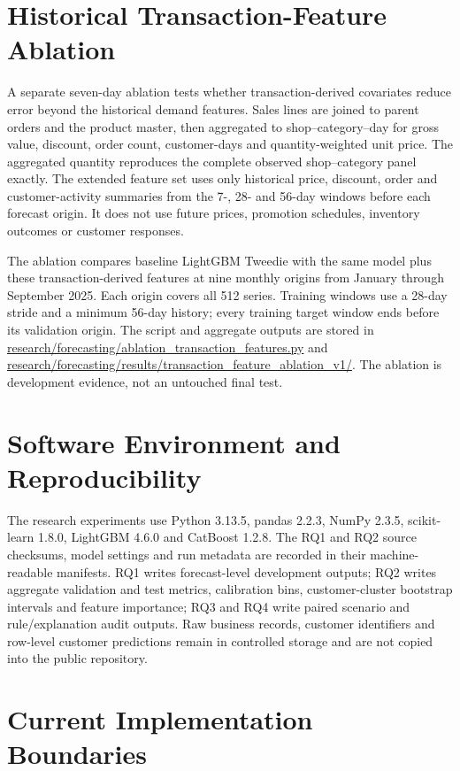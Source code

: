 \documentclass[a4paper,11pt,oneside]{book}
\theoremstyle{plain}
\theoremstyle{definition}
\theoremstyle{remark}
\begin{document}
\section{Historical Transaction-Feature Ablation}

A separate seven-day ablation tests whether transaction-derived covariates
reduce error beyond the historical demand features. Sales lines are joined
to parent orders and the product master, then aggregated to shop--category--day
for gross value, discount, order count, customer-days and quantity-weighted
unit price. The aggregated quantity reproduces the complete observed
shop--category panel exactly. The extended feature set uses only historical
price, discount, order and customer-activity summaries from the 7-, 28- and
56-day windows before each forecast origin. It does not use future prices,
promotion schedules, inventory outcomes or customer responses.

The ablation compares baseline LightGBM Tweedie with the same model plus
these transaction-derived features at nine monthly origins from January
through September 2025. Each origin covers all 512 series. Training windows
use a 28-day stride and a minimum 56-day history; every training target
window ends before its validation origin. The script and aggregate outputs
are stored in
\url{research/forecasting/ablation_transaction_features.py} and
\url{research/forecasting/results/transaction_feature_ablation_v1/}.
The ablation is development evidence, not an untouched final test.



\section{Software Environment and Reproducibility}

The research experiments use Python 3.13.5, pandas 2.2.3, NumPy 2.3.5,
scikit-learn 1.8.0, LightGBM 4.6.0 and CatBoost 1.2.8. The RQ1 and RQ2
source checksums, model settings and run metadata are recorded in their
machine-readable manifests. RQ1 writes forecast-level development outputs;
RQ2 writes aggregate validation and test metrics, calibration bins,
customer-cluster bootstrap intervals and feature importance; RQ3 and RQ4
write paired scenario and rule/explanation audit outputs. Raw business
records, customer identifiers and row-level customer predictions remain
in controlled storage and are not copied into the public repository.

\section{Current Implementation Boundaries}
\end{document}

